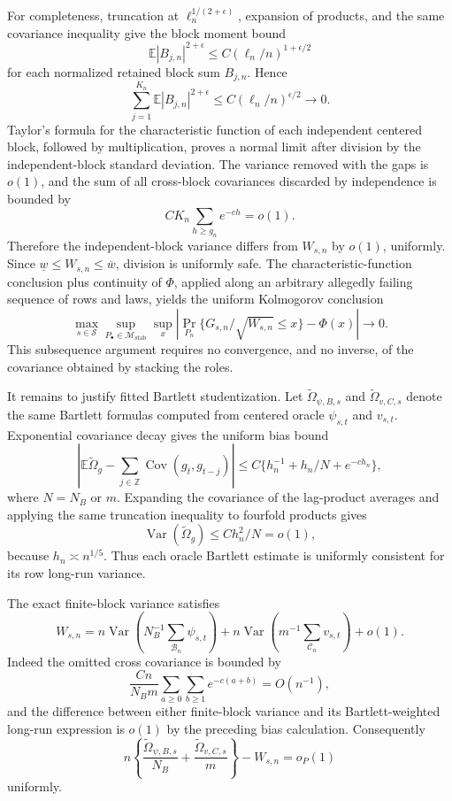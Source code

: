 For completeness, truncation at \(\ell_n^{1/(2+\epsilon)}\), expansion of products, and the same covariance inequality give the block moment bound
\[
 \mathbb E|B_{j,n}|^{2+\epsilon}\leq
 C(\ell_n/n)^{1+\epsilon/2}
\]
for each normalized retained block sum \(B_{j,n}\).  Hence
\[
 \sum_{j=1}^{K_n}\mathbb E|B_{j,n}|^{2+\epsilon}
 \leq C(\ell_n/n)^{\epsilon/2}\to0.
\]
Taylor's formula for the characteristic function of each independent centered block, followed by multiplication, proves a normal limit after division by the independent-block standard deviation.  The variance removed with the gaps is \(o(1)\), and the sum of all cross-block covariances discarded by independence is bounded by
\[
 C K_n\sum_{h\geq g_n}e^{-ch}=o(1).
\]
Therefore the independent-block variance differs from \(W_{s,n}\) by \(o(1)\), uniformly.  Since \(\underline w\leq W_{s,n}\leq\overline w\), division is uniformly safe.  The characteristic-function conclusion plus continuity of \(\Phi\), applied along an arbitrary allegedly failing sequence of rows and laws, yields the uniform Kolmogorov conclusion
\[
 \max_{s\in\mathcal S}\sup_{P_\bullet\in\mathcal M_{\mathrm{stab}}}
 \sup_x\left|\Pr_{P_n}\{G_{s,n}/\sqrt{W_{s,n}}\leq x\}-\Phi(x)\right|\to0.
\]
This subsequence argument requires no convergence, and no inverse, of the covariance obtained by stacking the roles.

It remains to justify fitted Bartlett studentization.  Let \(\widetilde\Omega_{\psi,B,s}\) and \(\widetilde\Omega_{v,C,s}\) denote the same Bartlett formulas computed from centered oracle \(\psi_{s,t}\) and \(v_{s,t}\).  Exponential covariance decay gives the uniform bias bound
\[
 \left|\mathbb E\widetilde\Omega_{g}-\sum_{j\in\mathbb Z}\operatorname{Cov}(g_t,g_{t-j})\right|
 \leq C\{h_n^{-1}+h_n/N+e^{-ch_n}\},
\]
where \(N=N_B\) or \(m\).  Expanding the covariance of the lag-product averages and applying the same truncation inequality to fourfold products gives
\[
 \operatorname{Var}(\widetilde\Omega_g)\leq C h_n^2/N=o(1),
\]
because \(h_n\asymp n^{1/5}\).  Thus each oracle Bartlett estimate is uniformly consistent for its row long-run variance.

The exact finite-block variance satisfies
\[
 W_{s,n}=n\operatorname{Var}\left(N_B^{-1}\sum_{\mathcal B_n}\psi_{s,t}\right)
 +n\operatorname{Var}\left(m^{-1}\sum_{\mathcal C_n}v_{s,t}\right)+o(1).
\]
Indeed the omitted cross covariance is bounded by
\[
 \frac{Cn}{N_Bm}\sum_{a\geq0}\sum_{b\geq1}e^{-c(a+b)}=O(n^{-1}),
\]
and the difference between either finite-block variance and its Bartlett-weighted long-run expression is \(o(1)\) by the preceding bias calculation.  Consequently
\[
 n\left\{\frac{\widetilde\Omega_{\psi,B,s}}{N_B}
 +\frac{\widetilde\Omega_{v,C,s}}m\right\}-W_{s,n}=o_P(1)
\]
uniformly.

